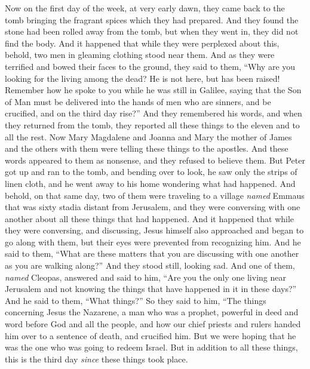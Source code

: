 \begin{biblechapter} %
 Now on the first day of the week, at very early dawn, they came back to the tomb bringing the fragrant spices which they had prepared.
\verse And they found the stone had been rolled away from the tomb,
\verse but when they went in, they did not find the body.
\verse And it happened that while they were perplexed about this, behold, two men in gleaming clothing stood near them.
\verse And as they were terrified and bowed their faces to the ground, they said to them, “Why are you looking for the living among the dead?
\verse He is not here, but has been raised! Remember how he spoke to you while he was still in Galilee,
\verse saying that the Son of Man must be delivered into the hands of men who are sinners, and be crucified, and on the third day rise?”
\verse And they remembered his words,
\verse and when they returned from the tomb, they reported all these things to the eleven and to all the rest.
\verse Now Mary Magdalene and Joanna and Mary the mother of James and the others with them were telling these things to the apostles.
\verse And these words appeared to them as nonsense, and they refused to believe them.
\verse But Peter got up and ran to the tomb, and bending over to look, he saw only the strips of linen cloth, and he went away to his home wondering what had happened.
 And behold, on that same day, two of them were traveling to a village \textit{named} Emmaus that was sixty stadia distant from Jerusalem,
\verse and they were conversing with one another about all these things that had happened.
\verse And it happened that while they were conversing, and discussing, Jesus himself also approached and began to go along with them,
\verse but their eyes were prevented from recognizing him.
\verse And he said to them, “What are these matters that you are discussing with one another as you are walking along?” And they stood still, looking sad.
\verse And one of them, \textit{named} Cleopas, answered and said to him, “Are you the only one living near Jerusalem and not knowing the things that have happened in it in these days?”
\verse And he said to them, “What things?” So they said to him, “The things concerning Jesus the Nazarene, a man who was a prophet, powerful in deed and word before God and all the people,
\verse and how our chief priests and rulers handed him over to a sentence of death, and crucified him.
\verse But we were hoping that he was the one who was going to redeem Israel. But in addition to all these things, this is the third day \textit{since} these things took place.

\end{biblechapter}
